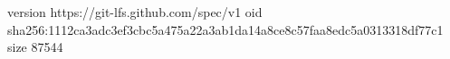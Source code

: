 version https://git-lfs.github.com/spec/v1
oid sha256:1112ca3adc3ef3cbc5a475a22a3ab1da14a8ce8c57faa8edc5a0313318df77c1
size 87544
